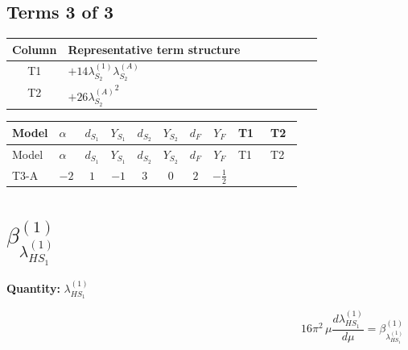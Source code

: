 \documentclass[8pt]{article}
\begin{document}
\begin{landscape}
\subsection*{Terms 3 of 3}
\begin{center}
\begin{tabular}{@{}c >{\raggedright\arraybackslash}p{0.82\linewidth}@{}}
\toprule
Column & Representative term structure \\
\midrule
T1 & \(\displaystyle +14 {\lambda_{S_2}^{(1)}} {\lambda_{S_2}^{(A)}}\) \\
\midrule
T2 & \(\displaystyle +26 {\lambda_{S_2}^{(A)}}^2\) \\
\midrule
\bottomrule
\end{tabular}
\end{center}
\smallskip
\tiny
\begin{longtable}{@{}llcccccc >{\raggedright\arraybackslash}p{0.21\linewidth} >{\raggedright\arraybackslash}p{0.21\linewidth}@{}}
\toprule
Model & $\alpha$ & $d_{S_1}$ & $Y_{S_1}$ & $d_{S_2}$ & $Y_{S_2}$ & $d_F$ & $Y_F$ & T1 & T2 \\
\midrule
\endfirsthead
\toprule
Model & $\alpha$ & $d_{S_1}$ & $Y_{S_1}$ & $d_{S_2}$ & $Y_{S_2}$ & $d_F$ & $Y_F$ & T1 & T2 \\
\midrule
\endhead
T3-A & $-2$ & $1$ & $-1$ & $3$ & $0$ & $2$ & $-\frac{1}{2}$ & \scriptsize\adjustbox{max width=\linewidth}{$\begin{gathered} +14 {\lambda_{S_2}^{(1)}} {\lambda_{S_2}^{(A)}}\end{gathered}$} & \scriptsize\adjustbox{max width=\linewidth}{$\begin{gathered} +26 {\lambda_{S_2}^{(A)}}^2\end{gathered}$} \\
\midrule
\bottomrule
\end{longtable}
\clearpage
\section*{$\beta_{\lambda_{HS_1}^{(1)}}^{(1)}$}
\noindent\textbf{Quantity: }$\lambda_{HS_1}^{(1)}$\par\smallskip
\[16\pi^2\,\mu\frac{d \lambda_{HS_1}^{(1)}}{d\mu}=\beta_{\lambda_{HS_1}^{(1)}}^{(1)}\]

\end{landscape}
\end{document}
